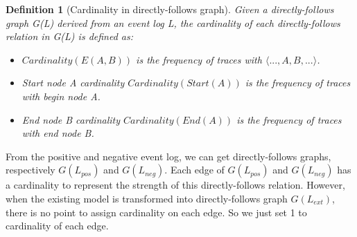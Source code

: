 \documentclass[]{article}
\newtheorem{mydef}{Definition}[section]
\begin{document}
\begin{mydef}[Cardinality in directly-follows graph]
	Given a directly-follows graph G(L) derived from an event log L, the cardinality of each directly-follows relation in G(L) is defined as:  
	\begin{itemize}
		\item $Cardinality(E(A,B))$ is the frequency of traces with $\langle ...,A,B,... \rangle$. 
		\item Start node A cardinality $Cardinality(Start(A))$ is the frequency of traces with begin node A.
		\item End node B cardinality $Cardinality(End(A))$ is the frequency of traces with end node B.
	\end{itemize}	
\end{mydef}
From the positive and negative event log, we can get directly-follows graphs, respectively $G(L_{pos})$ and $G(L_{neg})$. Each edge of  $G(L_{pos})$ and $G(L_{neg})$ has a cardinality to represent the strength of this directly-follows relation. 
However, when the existing model is transformed into  directly-follows graph $G(L_{ext})$, there is no point to assign cardinality on each edge. So we just set 1 to cardinality of each edge. 
\end{document}
